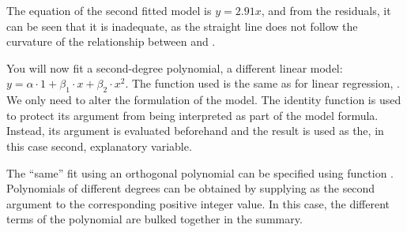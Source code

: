 \documentclass[krantz2]{krantz}\usepackage{knitr}
\begin{document}
The equation of the second fitted model is $y = 2.91 x$, and from the residuals, it can be seen that it is inadequate, as the straight line does not follow the curvature of the relationship between  and .

\begin{playground}
You will now fit a second-degree polynomial, a different linear model: $y = \alpha \cdot 1 + \beta_1 \cdot x + \beta_2 \cdot x^2$. The function used is the same as for linear regression, . We only need to alter the formulation of the model. The identity function  is used to protect its argument from being interpreted as part of the model formula. Instead, its argument is evaluated beforehand and the result is used as the, in this case second, explanatory variable.\label{chunk:stats:fm3}

\begin{knitrout}\footnotesize
{}\color{fgcolor}\begin{kframe}
\begin{alltt}
 \hlkwb{<-}  \hlopt{~}  \hlopt{+} \hlopt{^}\hlstd{),}  
  \hlstd{=} \hlstd{)}
\end{alltt}
\end{kframe}
\end{knitrout}

The ``same'' fit using an orthogonal polynomial can be specified using function . Polynomials of different degrees can be obtained by supplying as the second argument to  the corresponding positive integer value. In this case, the different terms of the polynomial are bulked together in the summary.

\begin{knitrout}\footnotesize
{}\color{fgcolor}\begin{kframe}
\begin{alltt}
 \hlkwb{<-}  \hlopt{~}  \hlstd{),}  
\end{alltt}
\end{kframe}
\end{knitrout}


\end{playground}
\end{document}

